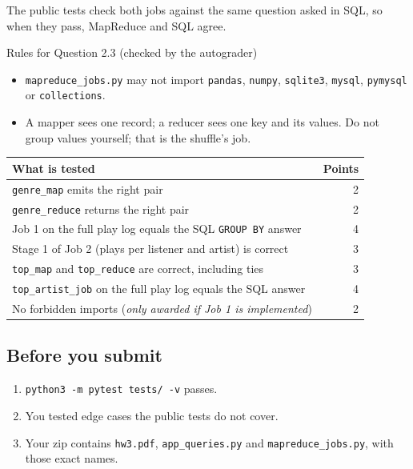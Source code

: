 \documentclass[11pt]{article}
\newcommand{\code}[1]{\texttt{#1}}
\begin{document}
The public tests check both jobs against the same question asked in SQL, so
when they pass, MapReduce and SQL agree.

\begin{warnbox}{Rules for Question 2.3 (checked by the autograder)}
\begin{itemize}[nosep]
  \item \code{mapreduce\_jobs.py} may not import \code{pandas}, \code{numpy},
  \code{sqlite3}, \code{mysql}, \code{pymysql} or \code{collections}.
  \item A mapper sees one record; a reducer sees one key and its values. Do not
  group values yourself; that is the shuffle's job.
\end{itemize}
\end{warnbox}

\begin{center}
\small
\begin{tabularx}{\linewidth}{@{}X r@{}}
\toprule
\textbf{What is tested} & \textbf{Points}\\
\midrule
\code{genre\_map} emits the right pair & 2\\
\code{genre\_reduce} returns the right pair & 2\\
Job 1 on the full play log equals the SQL \code{GROUP BY} answer & 4\\
Stage 1 of Job 2 (plays per listener and artist) is correct & 3\\
\code{top\_map} and \code{top\_reduce} are correct, including ties & 3\\
\code{top\_artist\_job} on the full play log equals the SQL answer & 4\\
No forbidden imports (\emph{only awarded if Job 1 is implemented}) & 2\\
\bottomrule
\end{tabularx}
\end{center}

\subsection*{Before you submit}

\begin{enumerate}[nosep]
  \item \code{python3 -m pytest tests/ -v} passes.
  \item You tested edge cases the public tests do not cover.
  \item Your zip contains \code{hw3.pdf}, \code{app\_queries.py} and
  \code{mapreduce\_jobs.py}, with those exact names.
\end{enumerate}
\end{document}
